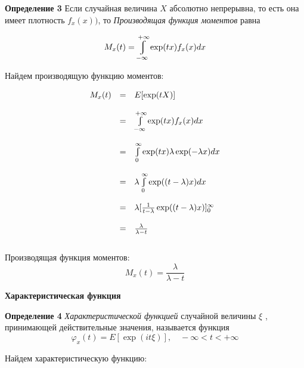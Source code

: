 \documentclass[a4paper,12pt, oneside]{book}
\let\int\varint
\begin{document}
	\normalsize{\textbf{Определение 3}} Если случайная величина $X$ абсолютно непрерывна, то есть она имеет плотность $f_x(x))$, то \textit{ Производящая функция моментов } равна
		
	$$
	M_x(t) =  \int_{-\infty}^{+\infty} \exp(tx) f_x(x)dx
	$$
	
	\vspace{\baselineskip}
	Найдем производящую функцию моментов:
	
	$$
	\begin{array}{rcl}
	M_x(t) &=& E[\exp(tX)] \\
	\\
	&=& \int\limits_{-\infty}^{+\infty} \exp(tx) f_x(x)dx \\
	\\
	&=& \int\limits_0^\infty \exp(tx) \lambda \exp(-\lambda x)dx\\
	\\
	&=& \lambda \int\limits_0^\infty \exp((t-\lambda) x)dx\\
	\\
	&=&\lambda[\frac{1}{t-\lambda} \exp((t-\lambda) x)]_0^\infty\\
	\\
	&=&\frac{\lambda}{\lambda-t}
	\end{array}
	$$
	\\
	Производящая функция моментов:
	$$
	M_x(t) = \frac{\lambda}{\lambda-t}
	$$
	 
	 
	\vspace{5mm}
	\large{\textbf{{Характеристическая функция}}}
	\vspace{5mm}
	
	\normalsize{\textbf{Определение 4}}\textit{ Характеристической функцией } случайной величины $\xi$ , принимающей действительные значения, называется функция 
	$$
	\varphi_x(t) = E[\exp(it\xi)],   \quad    -\infty <t < +\infty
	$$
	 
	\vspace{\baselineskip}
	Найдем характеристическую функцию:
	
\end{document}
